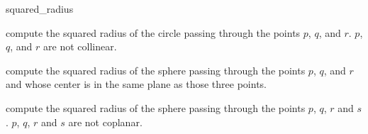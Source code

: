 \begin{ccRefFunction}{squared_radius}

 {compute the squared radius of the circle passing through the points
 $p$, $q$, and $r$.  \ccPrecond $p$, $q$, and $r$ are not collinear.}

 {compute the squared radius of the sphere passing through the points $p$,
 $q$, and $r$ and whose center is in the same plane as those three points.}

 {compute the squared radius of the sphere passing through the points $p$,
 $q$, $r$ and $s$.  \ccPrecond $p$, $q$, $r$ and $s$ are not coplanar.}

\end{ccRefFunction}
